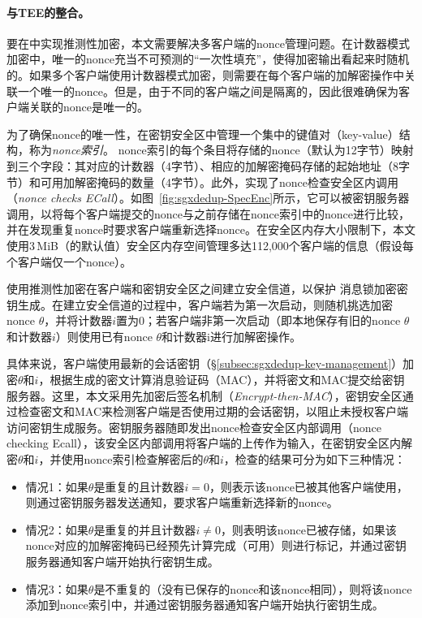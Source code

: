\paragraph*{与TEE的整合。}要在\sysnameS 中实现推测性加密，本文需要解决多客户端的nonce管理问题。在计数器模式加密中，唯一的nonce充当不可预测的“一次性填充”，使得加密输出看起来时随机的\cite{counter}。如果多个客户端使用计数器模式加密，则需要在每个客户端的加解密操作中关联一个唯一的nonce。但是，由于不同的客户端之间是隔离的，因此很难确保为客户端关联的nonce是唯一的。

为了确保nonce的唯一性，\sysnameS 在密钥安全区中管理一个集中的键值对（key-value）结构，称为\textit{nonce索引}。 nonce索引的每个条目将存储的nonce（默认为12字节）映射到三个字段：其对应的计数器（4字节）、相应的加解密掩码存储的起始地址（8字节）和可用加解密掩码的数量（4字节）。此外，\sysnameS 实现了nonce检查安全区内调用（\textit{nonce checks ECall}）。如图~\ref{fig:sgxdedup-SpecEnc}所示，它可以被密钥服务器调用，以将每个客户端提交的nonce与之前存储在nonce索引中的nonce进行比较，并在发现重复nonce时要求客户端重新选择nonce。在安全区内存大小限制下，本文使用3\,MiB（\sysnameS 的默认值）安全区内存空间管理多达112,000个客户端的信息（假设每个客户端仅一个nonce）。

\sysnameS 使用推测性加密在客户端和密钥安全区之间建立安全信道，以保护 消息锁加密密钥生成。在建立安全信道的过程中，客户端若为第一次启动，则随机挑选加密nonce $\theta$，并将计数器$i$置为0；若客户端非第一次启动（即本地保存有旧的nonce $\theta$和计数器$i$）则使用已有nonce $\theta$和计数器i进行加解密操作。

具体来说，客户端使用最新的会话密钥（\S\ref{subsec:sgxdedup-key-management}）加密$\theta$和$i$，根据生成的密文计算消息验证码（MAC），并将密文和MAC提交给密钥服务器。这里，本文采用先加密后签名机制（\textit{Encrypt-then-MAC}）\cite{bellare2000Authenticated}，密钥安全区通过检查密文和MAC来检测客户端是否使用过期的会话密钥，以阻止未授权客户端访问密钥生成服务。密钥服务器随即发出nonce检查安全区内部调用（nonce checking Ecall），该安全区内部调用将客户端的上传作为输入，在密钥安全区内解密$\theta$和$i$，并使用nonce索引检查解密后的$\theta$和$i$，检查的结果可分为如下三种情况：

\begin{itemize}[leftmargin=*]
    \item 情况1：如果$\theta$是重复的且计数器$i = 0$，则表示该nonce已被其他客户端使用，则通过密钥服务器发送通知，要求客户端重新选择新的nonce。
    \item 情况2：如果$\theta$是重复的并且计数器$i \neq 0$，则表明该nonce已被存储，如果该nonce对应的加解密掩码已经预先计算完成（可用）则进行标记，并通过密钥服务器通知客户端开始执行密钥生成。
    \item 情况3：如果$\theta$是不重复的（没有已保存的nonce和该nonce相同），则将该nonce添加到nonce索引中，并通过密钥服务器通知客户端开始执行密钥生成。
\end{itemize}

